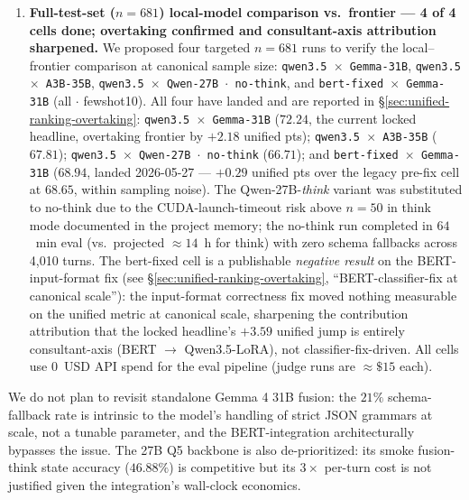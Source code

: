 \documentclass[11pt]{article}
\begin{document}
\begin{enumerate}
    \item \textbf{Full-test-set ($n{=}681$) local-model comparison vs.\ frontier --- 4 of 4 cells done; overtaking confirmed and consultant-axis attribution sharpened.} We proposed four targeted $n{=}681$ runs to verify the local--frontier comparison at canonical sample size: \texttt{qwen3.5 $\times$ Gemma-31B}, \texttt{qwen3.5 $\times$ A3B-35B}, \texttt{qwen3.5 $\times$ Qwen-27B $\cdot$ no-think}, and \texttt{bert-fixed $\times$ Gemma-31B} (all $\cdot$ fewshot10). All four have landed and are reported in \S\ref{sec:unified-ranking-overtaking}: \texttt{qwen3.5 $\times$ Gemma-31B} ($72.24$, the current locked headline, overtaking frontier by $+2.18$ unified pts); \texttt{qwen3.5 $\times$ A3B-35B} ($67.81$); \texttt{qwen3.5 $\times$ Qwen-27B $\cdot$ no-think} ($66.71$); and \texttt{bert-fixed $\times$ Gemma-31B} ($68.94$, landed 2026-05-27 --- $+0.29$ unified pts over the legacy pre-fix cell at $68.65$, within sampling noise). The Qwen-27B-\emph{think} variant was substituted to no-think due to the CUDA-launch-timeout risk above $n{=}50$ in think mode documented in the project memory; the no-think run completed in $64$~min eval (vs.\ projected $\approx 14$~h for think) with zero schema fallbacks across 4{,}010 turns. The bert-fixed cell is a publishable \emph{negative result} on the BERT-input-format fix (see \S\ref{sec:unified-ranking-overtaking}, ``BERT-classifier-fix at canonical scale''): the input-format correctness fix moved nothing measurable on the unified metric at canonical scale, sharpening the contribution attribution that the locked headline's $+3.59$ unified jump is entirely consultant-axis (BERT $\to$ Qwen3.5-LoRA), not classifier-fix-driven. All cells use $0$~USD API spend for the eval pipeline (judge runs are $\approx \$15$ each).
\end{enumerate}

We do not plan to revisit standalone Gemma 4 31B fusion: the $21\%$ schema-fallback rate is intrinsic to the model's handling of strict JSON grammars at scale, not a tunable parameter, and the BERT-integration architecturally bypasses the issue. The 27B Q5 backbone is also de-prioritized: its smoke fusion-think state accuracy ($46.88\%$) is competitive but its $3\times$ per-turn cost is not justified given the integration's wall-clock economics.
\end{document}
